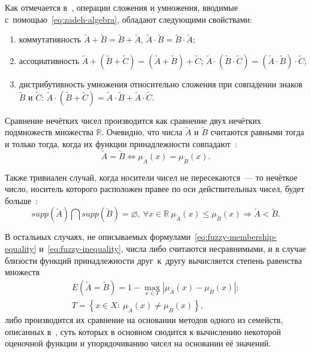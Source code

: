 Как отмечается в~\cite{Pospelov, Borisov_Alexeev_Msk, Yakhyaeva}, операции сложения и умножения, вводимые с~помощью~\eqref{eq:zadeh-algebra}, обладают следующими свойствами:
\begin{enumerate}
	\item коммутативность $\tilde{A}+\tilde{B}=\tilde{B}+\tilde{A}$, $\tilde{A}\cdot \tilde{B}=\tilde{B}\cdot \tilde{A}$;
	\item ассоциативность $\tilde{A}+\left( \tilde{B}+\tilde{C} \right)=\left( \tilde{A}+\tilde{B} \right)+\tilde{C}$; $\tilde{A}\cdot \left( \tilde{B}\cdot \tilde{C} \right)=\left( \tilde{A}\cdot \tilde{B} \right)\cdot \tilde{C}$;
	\item дистрибутивность умножения относительно сложения при совпадении знаков $\tilde{B}$ и $\tilde{C}$: $\tilde{A}\cdot \left( \tilde{B}+\tilde{C} \right)=\tilde{A}\cdot \tilde{B}+\tilde{A}\cdot \tilde{C}$.
\end{enumerate}

Сравнение нечётких чисел производится как сравнение двух нечётких подмножеств множества $\mathbb{R}$. Очевидно, что числа $\tilde A$ и $\tilde B$ считаются равными тогда и только тогда, когда их функции принадлежности совпадают~\cite{Ibragimov, Yager_Book}:
\begin{equation}
\label{eq:fuzzy-membership-equality}
  \tilde A = \tilde B \Leftrightarrow \mu_{\tilde A} \left( x \right) = \mu_{\tilde B} \left( x \right).
\end{equation}

Также тривиален случай, когда носители чисел не пересекаются~--- то нечёткое число, носитель которого расположен правее по оси действительных чисел, будет больше~\cite{Ibragimov}:
\begin{equation}
\label{eq:fuzzy-inequality}
  supp \left( \tilde A \right) \bigcap supp \left( \tilde B \right) = \varnothing,\ \forall x \in \mathbb{R}\ \mu_{\tilde A} \left( x \right) \leqslant \mu_{\tilde B} \left( x \right) \Rightarrow \tilde A < \tilde B.
\end{equation}

В остальных случаях, не описываемых формулами~\eqref{eq:fuzzy-membership-equality} и~\eqref{eq:fuzzy-inequality}, числа либо считаются несравнимыми, и в случае близости функций принадлежности друг~к~другу вычисляется степень равенства множеств~\cite{Rutkovskaya, Siler_Buckley, Yager_Book}
\begin{gather*}
  E\left(\tilde A = \tilde B \right)=1 - \underset{x \in T} {\mathop{\max}} \left| \mu_{\tilde A} \left( x \right) - \mu_{\tilde B} \left( x \right) \right|; \\
  T = \left \{ x \in X:\ \mu_{\tilde A} \left( x \right) \neq \mu_{\tilde B} \left( x \right) \right \},
\end{gather*}
либо производится их сравнение на основании методов одного из семейств, описанных в~\cite{Vorontsov_Compare, Cheng_Comparison}, суть которых в основном сводится к вычислению некоторой оценочной функции и упорядочиванию чисел на основании её значений.

